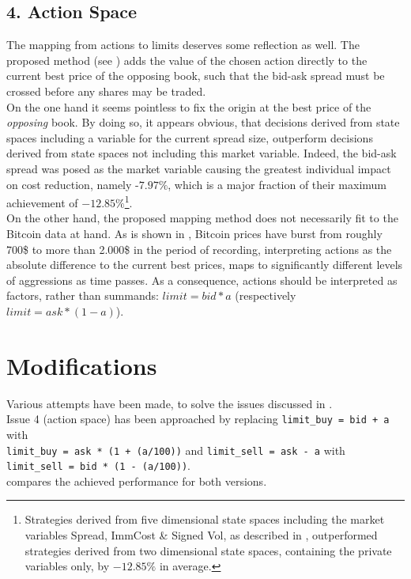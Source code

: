 \subsection*{4. Action Space}
The mapping from actions to limits deserves some reflection as well. The proposed method (see ) adds the value of the chosen action directly to the current best price of the opposing book, such that the bid-ask spread must be crossed before any shares may be traded.\\

On the one hand it seems pointless to fix the origin at the best price of the \emph{opposing} book. By doing so, it appears obvious, that decisions derived from state spaces including a variable for the current spread size, outperform decisions derived from state spaces not including this market variable. Indeed, the  bid-ask spread was posed as the market variable causing the greatest individual impact on cost reduction, namely -$7.97\%$, which is a major fraction of their maximum achievement of  $-12.85\%$\footnote{Strategies derived from five dimensional state spaces including the market variables Spread, ImmCost \& Signed Vol, as described in , outperformed strategies derived from two dimensional state spaces, containing the private variables only, by $-12.85\%$ in average.}.\\

On the other hand, the proposed mapping method does not necessarily fit to the Bitcoin data at hand. As is shown in , Bitcoin prices have burst from roughly 700\$ to more than 2.000\$ in the period of recording, \ie interpreting actions as the absolute difference to the current best prices, maps to significantly different levels of aggressions as time passes. As a consequence, actions should be interpreted as factors, rather than summands: $limit = bid * a$ (respectively $limit = ask * (1-a)$).


\section{Modifications}
\label{chap:modifications}
Various attempts have been made, to solve the issues discussed in .\\

Issue 4 (action space) has been approached by replacing \lstinline!limit_buy = bid + a! with \\\lstinline!limit_buy = ask * (1 + (a/100))!  and  \lstinline!limit_sell = ask - a! with \lstinline!limit_sell = bid * (1 - (a/100))!. \\ compares the achieved performance for both versions.

